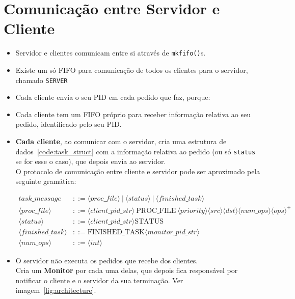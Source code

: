\documentclass[11pt,a4paper]{report}%
\begin{document}
\section{Comunicação entre Servidor e Cliente}

\begin{itemize}
  \item Servidor e clientes comunicam entre si através de \texttt{mkfifo()}s.
  \item Existe um só FIFO para comunicação de todos os clientes para o servidor, chamado
  \texttt{SERVER}
  \item Cada cliente envia o seu PID em cada pedido que faz, porque:
  \item Cada cliente tem um FIFO próprio para receber informação relativa ao seu pedido, identificado
  pelo seu PID.

  \item \textbf{Cada cliente}, ao comunicar com o servidor, cria uma estrutura de dados~\ref{code:task_struct}
  com a informação relativa ao pedido (ou só \texttt{status} se for esse o caso), que depois envia ao servidor.\\
  O protocolo de comunicação entre cliente e servidor pode ser aproximado pela seguinte gramática:

\begin{align*}
  task\_message &::= \langle proc\_file \rangle\ |\ \langle status \rangle\ |\ \langle finished\_task \rangle \\
  \langle proc\_file \rangle &::= \langle client\_pid\_str \rangle \ \text{PROC\_FILE} \ \langle priority \rangle \langle src \rangle \langle dst \rangle \langle num\_ops \rangle \langle ops \rangle^+\\
  \langle status \rangle    &::= \langle client\_pid\_str \rangle \text{STATUS} \\
  \langle finished\_task \rangle &::= \text{FINISHED\_TASK} \langle monitor\_pid\_str \rangle \\
  \langle num\_ops \rangle &::= \langle int \rangle
\end{align*}
\label{text:protocol}

  \item O servidor não executa os pedidos que recebe dos clientes.\\
  Cria um \textbf{Monitor} por cada uma delas, que depois fica responsável por notificar o
  cliente e o servidor da sua terminação\label{text:monitor}. Ver imagem~\ref{fig:architecture}.

\end{itemize}
\end{document}
